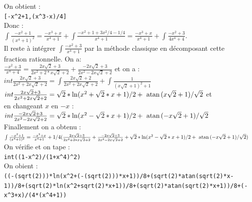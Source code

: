 \documentclass[a4paper,11pt]{book}
\newcommand{\atan}{\,\,\mbox{atan\,}}
\begin{document}
On obtient :\\
{\tt [-x\verb|^|2+1,(x\verb|^|3-x)/4]}\\
Donc :\\
$\int\frac{-x^2+1}{(x^4+1)^2}=\frac{-x^3+x}{x^4+1}+\int\frac{-x^2+1+3x^2/4-1/4}{x^4+1}=\frac{-x^3+x}{x^4+1}+\int\frac{-x^2+3}{4x^4+4}$.\\
Il reste \`a int\'egrer $\int\frac{-x^2+3}{x^4+1}$ par la m\'ethode classique
en d\'ecomposant cette fraction rationnelle.
On a:\\
$\frac{-x^2+3}{x^4+4}=\frac{2x\sqrt 2+3}{2x^2+2*x\sqrt 2+2}+\frac{-2x\sqrt 2+3}{2x^2-2x\sqrt 2+2}$
et on a :\\
$int\frac{2x\sqrt 2+3}{2x^2+2x\sqrt 2+2}=\int\frac{2x\sqrt 2+2}{2x^2+2x\sqrt 2+2}+\int\frac{1}{(x\sqrt 2 +1)^2+1}$\\
$int\frac{2x\sqrt 2+3}{2x^2+2x\sqrt 2+2}=\sqrt 2*\ln(x^2+\sqrt 2*x+1)/2+\atan(x\sqrt 2 +1)/\sqrt 2$ et\\
en changeant $x$ en $-x$ :\\
$int\frac{-2x\sqrt 2+3}{2x^2-2x\sqrt 2+2}=\sqrt 2*\ln(x^2-\sqrt 2*x+1)/2+\atan(-x\sqrt 2 +1)/\sqrt 2$\\
Finallement on a obtenu :\\
$\int\frac{-x^2+1}{(x^4+1)^2}=\frac{-x^3+x}{x^4+1}+1/4(\frac{2x\sqrt 2+3}{2x^2+2*x\sqrt 2+2}+\frac{-2x\sqrt 2+3}{2x^2-2x\sqrt 2+2}+\sqrt 2*\ln(x^2-\sqrt 2*x+1)/2+\atan(-x\sqrt 2 +1)/\sqrt 2)$\\
On v\'erifie et on tape :\\
{\tt int((1-x\verb|^|2)/(1+x\verb|^|4)\verb|^|2)}\\
On obient :\\
{\tt ((-(sqrt(2)))*ln(x\verb|^|2+(-(sqrt(2)))*x+1))/8+(sqrt(2)*atan(sqrt(2)*x-1))/8+(sqrt(2)*ln(x\verb|^|2+sqrt(2)*x+1))/8+(sqrt(2)*atan(sqrt(2)*x+1))/8+(-x\verb|^|3+x)/(4*(x\verb|^|4+1))}\\
\end{document}
